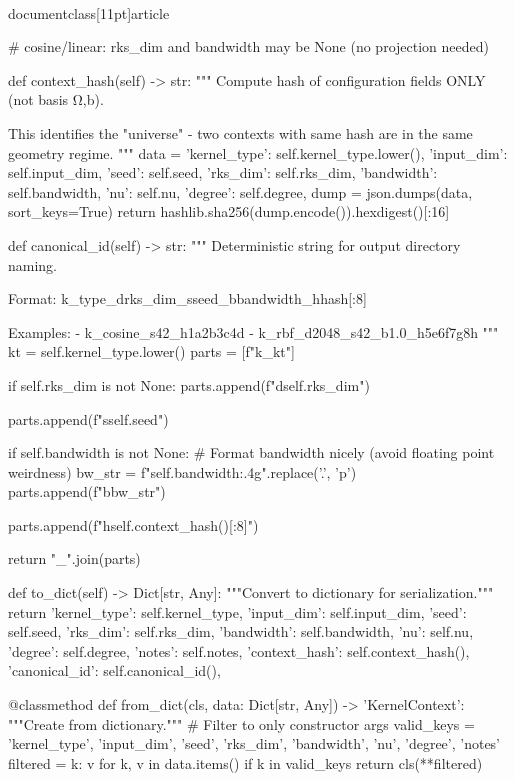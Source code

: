\\documentclass[11pt]{article}
\begin{document}
\begin{CodeBlock}
        # cosine/linear: rks_dim and bandwidth may be None (no projection needed)
    
    def context_hash(self) -> str:
        """
        Compute hash of configuration fields ONLY (not basis Ω,b).
        
        This identifies the "universe" - two contexts with same hash
        are in the same geometry regime.
        """
        data = {
            'kernel_type': self.kernel_type.lower(),
            'input_dim': self.input_dim,
            'seed': self.seed,
            'rks_dim': self.rks_dim,
            'bandwidth': self.bandwidth,
            'nu': self.nu,
            'degree': self.degree,
        }
        dump = json.dumps(data, sort_keys=True)
        return hashlib.sha256(dump.encode()).hexdigest()[:16]
    
    def canonical_id(self) -> str:
        """
        Deterministic string for output directory naming.
        
        Format: k_{type}_d{rks_dim}_s{seed}_b{bandwidth}_h{hash[:8]}
        
        Examples:
            - k_cosine_s42_h1a2b3c4d
            - k_rbf_d2048_s42_b1.0_h5e6f7g8h
        """
        kt = self.kernel_type.lower()
        parts = [f"k_{kt}"]
        
        if self.rks_dim is not None:
            parts.append(f"d{self.rks_dim}")
        
        parts.append(f"s{self.seed}")
        
        if self.bandwidth is not None:
            # Format bandwidth nicely (avoid floating point weirdness)
            bw_str = f"{self.bandwidth:.4g}".replace('.', 'p')
            parts.append(f"b{bw_str}")
        
        parts.append(f"h{self.context_hash()[:8]}")
        
        return "_".join(parts)
    
    def to_dict(self) -> Dict[str, Any]:
        """Convert to dictionary for serialization."""
        return {
            'kernel_type': self.kernel_type,
            'input_dim': self.input_dim,
            'seed': self.seed,
            'rks_dim': self.rks_dim,
            'bandwidth': self.bandwidth,
            'nu': self.nu,
            'degree': self.degree,
            'notes': self.notes,
            'context_hash': self.context_hash(),
            'canonical_id': self.canonical_id(),
        }
    
    @classmethod
    def from_dict(cls, data: Dict[str, Any]) -> 'KernelContext':
        """Create from dictionary."""
        # Filter to only constructor args
        valid_keys = {'kernel_type', 'input_dim', 'seed', 'rks_dim', 
                      'bandwidth', 'nu', 'degree', 'notes'}
        filtered = {k: v for k, v in data.items() if k in valid_keys}
        return cls(**filtered)
    

\end{CodeBlock}
\end{document}
